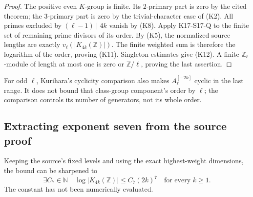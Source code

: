 \begin{proof}
The positive even \(K\)-group is finite. Its 2-primary part is
zero by the cited theorem; the 3-primary part is zero by the
trivial-character case of (K2). All primes excluded by
\((\ell-1)\mid4k\) vanish by (K8).
Apply K17-S17-Q to the finite set of remaining prime divisors
of its order. By (K5), the normalized source lengths are
exactly
\(v_\ell(|K_{4k}(\mathbb Z)|)\). The finite weighted sum is
therefore the logarithm of the order, proving (K11).
Singleton estimates give (K12). A finite
\(\mathbb Z_\ell\)-module of length at most one is zero or
\(\mathbb Z/\ell\), proving the last assertion.
\end{proof}

For odd \(\ell\), Kurihara's cyclicity comparison also makes
\(A_\ell^{[-2k]}\) cyclic in the last range. It does not
bound that class-group component's order by \(\ell\);
the comparison controls its number of generators, not its
whole order.

\subsection{Extracting exponent seven from the source proof}

\begin{theorem}[VK-EXP7]
Keeping the source's fixed levels and using the exact
highest-weight dimensions, the bound can be sharpened to
\[
 \exists C_7\in\mathbb N\quad
 \log|K_{4k}(\mathbb Z)|\le C_7(2k)^7
 \quad\text{for every }k\ge1.                       \tag{K13}
\]
The constant has not been numerically evaluated.
\end{theorem}

